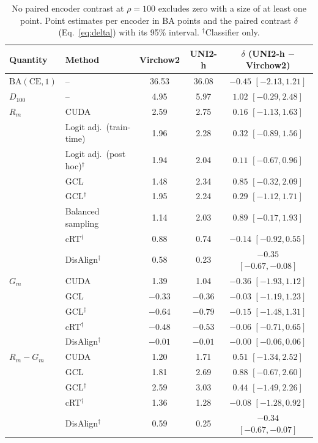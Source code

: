 \begin{table}[t]
\centering
\small
\begin{tabular}{@{}llccc@{}}
\toprule
Quantity & Method & Virchow2 & UNI2-h & $\delta$ (UNI2-h $-$ Virchow2) \\
\midrule
$\mathrm{BA}(\mathrm{CE},1)$ & -- & 36.53 & 36.08 & $-0.45$ $[-2.13, 1.21]$ \\
$D_{100}$ & -- & 4.95 & 5.97 & $1.02$ $[-0.29, 2.48]$ \\
\midrule
$R_m$ & CUDA & 2.59 & 2.75 & $0.16$ $[-1.13, 1.63]$ \\
 & Logit adj.\ (train-time) & 1.96 & 2.28 & $0.32$ $[-0.89, 1.56]$ \\
 & Logit adj.\ (post hoc)$^{\dagger}$ & 1.94 & 2.04 & $0.11$ $[-0.67, 0.96]$ \\
 & GCL & 1.48 & 2.34 & $0.85$ $[-0.32, 2.09]$ \\
 & GCL$^{\dagger}$ & 1.95 & 2.24 & $0.29$ $[-1.12, 1.71]$ \\
 & Balanced sampling & 1.14 & 2.03 & $0.89$ $[-0.17, 1.93]$ \\
 & cRT$^{\dagger}$ & 0.88 & 0.74 & $-0.14$ $[-0.92, 0.55]$ \\
 & DisAlign$^{\dagger}$ & 0.58 & 0.23 & $-0.35$ $[-0.67, -0.08]$ \\
\midrule
$G_m$ & CUDA & 1.39 & 1.04 & $-0.36$ $[-1.93, 1.12]$ \\
 & GCL & $-0.33$ & $-0.36$ & $-0.03$ $[-1.19, 1.23]$ \\
 & GCL$^{\dagger}$ & $-0.64$ & $-0.79$ & $-0.15$ $[-1.48, 1.31]$ \\
 & cRT$^{\dagger}$ & $-0.48$ & $-0.53$ & $-0.06$ $[-0.71, 0.65]$ \\
 & DisAlign$^{\dagger}$ & $-0.01$ & $-0.01$ & $-0.00$ $[-0.06, 0.06]$ \\
\midrule
$R_m-G_m$ & CUDA & 1.20 & 1.71 & $0.51$ $[-1.34, 2.52]$ \\
 & GCL & 1.81 & 2.69 & $0.88$ $[-0.67, 2.60]$ \\
 & GCL$^{\dagger}$ & 2.59 & 3.03 & $0.44$ $[-1.49, 2.26]$ \\
 & cRT$^{\dagger}$ & 1.36 & 1.28 & $-0.08$ $[-1.28, 0.92]$ \\
 & DisAlign$^{\dagger}$ & 0.59 & 0.25 & $-0.34$ $[-0.67, -0.07]$ \\
\bottomrule
\end{tabular}
\caption{No paired encoder contrast at $\rho=100$ excludes zero with a size of at least one point. Point estimates per encoder in BA points and the paired contrast $\delta$ (Eq.~\ref{eq:delta}) with its 95\% interval. $^{\dagger}$Classifier only.}
\label{tab:contrast}
\end{table}

